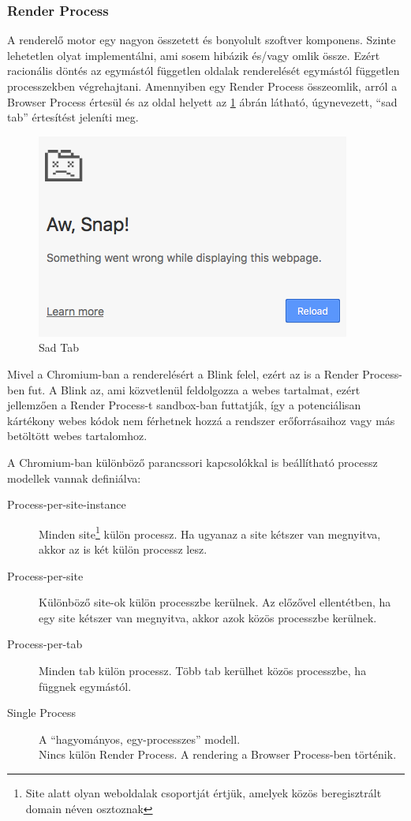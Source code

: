 \documentclass[12pt]{report}
\begin{document}
\subsubsection{Render Process}
A renderelő motor egy nagyon összetett és bonyolult szoftver komponens. Szinte lehetetlen
olyat implementálni, ami sosem hibázik és/vagy omlik össze. \cite{bib:chromium-multi-process}
Ezért racionális döntés az egymástól független oldalak renderelését egymástól független
processzekben végrehajtani. Amennyiben egy Render Process összeomlik, arról a
Browser Process értesül és az oldal helyett az \ref{fig:sad-tab} ábrán látható,
úgynevezett, ``sad tab'' értesítést jeleníti meg.

\begin{figure}[h]
    \centering
    \includegraphics[scale=0.8]{sad-tab}
    \caption{
        \label{fig:sad-tab}
        Sad Tab
    }
\end{figure}

Mivel a Chromium-ban a renderelésért a Blink felel, ezért az is a Render Process-ben fut.
A Blink az, ami közvetlenül feldolgozza a webes tartalmat, ezért jellemzően a
Render Process-t sandbox-ban futtatják, így a potenciálisan kártékony webes kódok nem
férhetnek hozzá a rendszer erőforrásaihoz vagy más betöltött webes tartalomhoz.

A Chromium-ban különböző parancssori kapcsolókkal is beállítható processz modellek
vannak definiálva:
\begin{description}
    \item[Process-per-site-instance]
        Minden site\footnote{Site alatt olyan weboldalak csoportját értjük, amelyek
        közös beregisztrált domain néven osztoznak} külön processz.
        Ha ugyanaz a site kétszer van megnyitva, akkor az is két külön processz lesz.
    \item[Process-per-site]
        Különböző site-ok külön processzbe kerülnek. Az előzővel ellentétben, ha egy site
        kétszer van megnyitva, akkor azok közös processzbe kerülnek.
    \item[Process-per-tab]
        Minden tab külön processz. Több tab kerülhet közös processzbe, ha függnek egymástól.
    \item[Single Process]
        A ``hagyományos, egy-processzes'' modell. \\
        Nincs külön Render Process. A rendering a Browser Process-ben történik.
\end{description}
\end{document}
